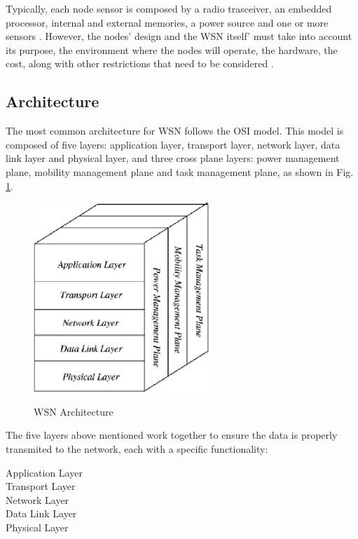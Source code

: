 Typically, each node sensor is composed by a radio trasceiver, an embedded processor, internal
and external memories, a power source and one or more sensors \cite{Wang2010}. However, the
nodes' design and the WSN itself' must take into account its purpose, the environment where
the nodes will operate, the hardware, the cost, along with other restrictions that need to
be considered \cite{Yick2008}.


\subsection{Architecture}
\label{subsec:wsn_architecture}
The most common architecture for WSN follows the OSI model. This model is composed of five
layers: application layer, transport layer, network layer, data link layer and physical layer,
and three cross plane layers: power management plane, mobility management plane and task
management plane, as shown in Fig. \ref{fig:wsn_architecture}.

\begin{figure}[h]
    \caption{WSN Architecture \cite{Akyildiz2002}}
    \centering
    \includegraphics[scale=0.5]{Chapters/Figures/wsn_architecture.png}
    \label{fig:wsn_architecture}
\end{figure}

The five layers above mentioned work together to ensure the data is properly transmited to the
network, each with a specific functionality:
\begin{description}
    \item[Application Layer]
    \item[Transport Layer]
    \item[Network Layer]
    \item[Data Link Layer]
    \item[Physical Layer]
\end{description}

